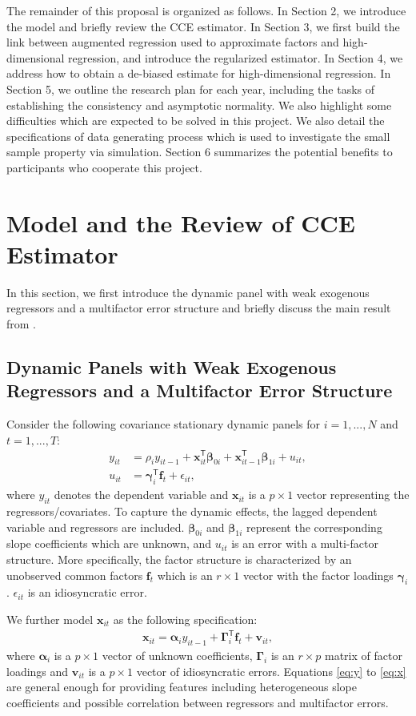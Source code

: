 \documentclass[11pt,a4paper]{article}
\newcommand{\Balpha}{\boldsymbol{\alpha}}
\newcommand{\Bbeta}{\boldsymbol{\beta}}
\newcommand{\Bgamma}{\boldsymbol{\gamma}}
\newcommand{\BGamma}{\boldsymbol{\Gamma}}
\newcommand{\MBf}{\mathbf{f}}
\newcommand{\MBv}{\mathbf{v}}
\newcommand{\MBx}{\mathbf{x}}
\newcommand{\tp}{\mathsf{T}}
\theoremstyle{definition}
\begin{document}
The remainder of this proposal is organized as follows. In Section 2, we introduce the model and briefly review the CCE estimator. In Section 3, we first build the link between augmented regression used to approximate factors and high-dimensional regression, and introduce the regularized estimator. In Section 4, we address how to obtain a de-biased estimate for high-dimensional regression. In Section 5, we outline the research plan for each year, including the tasks of establishing the consistency and asymptotic normality. We also highlight some difficulties which are expected to be solved in this project. We also detail the specifications of data generating process which is used to investigate the small sample property via simulation. Section 6 summarizes the potential benefits to participants  who cooperate this project.


\section{Model and the Review of CCE Estimator}\label{Sec:model}
In this section, we first introduce the dynamic panel with weak exogenous regressors and a multifactor error structure and briefly discuss the main result from \citet{Chudik2015}.

\subsection{Dynamic Panels with Weak Exogenous Regressors and a Multifactor Error Structure}
Consider the following covariance stationary dynamic panels for $i=1,...,N$ and $t=1,...,T$:
\begin{align}
y_{it}&=\rho_iy_{it-1}+\MBx_{it}^{\tp}\Bbeta_{0i}+\MBx_{it-1}^{\tp}\Bbeta_{1i}+u_{it},\label{eq:y}\\
u_{it}&=\Bgamma_{i}^{\tp}\MBf_t+\epsilon_{it},\label{eq:u}
\end{align}
where $y_{it}$ denotes the dependent variable and $\MBx_{it}$ is a $p\times 1$ vector representing the regressors/covariates. To capture the dynamic effects, the lagged dependent variable and regressors are included. $\Bbeta_{0i}$ and $\Bbeta_{1i}$ represent  the corresponding slope coefficients which are unknown, and $u_{it}$ is an error with a multi-factor structure. More specifically, the factor structure is characterized by an unobserved common factors $\MBf_t$ which is an $r\times 1$ vector with the factor loadings $\Bgamma_i$. $\epsilon_{it}$ is an idiosyncratic error.

We further model $\MBx_{it}$ as the following specification:
\begin{align}
\MBx_{it}=\Balpha_iy_{it-1}+\BGamma_i^{\tp}\MBf_t+\MBv_{it}, \label{eq:x}
\end{align}
where $\Balpha_i$ is a $p\times 1$ vector of unknown coefficients, $\BGamma_i$ is an $r\times p$ matrix of factor loadings and $\MBv_{it}$ is a $p\times 1$ vector of idiosyncratic errors. Equations \eqref{eq:y} to \eqref{eq:x} are general enough for providing features including heterogeneous slope coefficients and possible correlation between regressors and multifactor errors.
\end{document}
